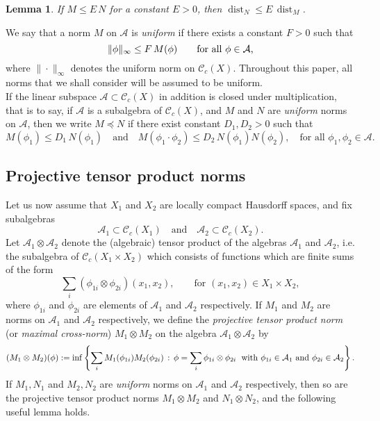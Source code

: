 \documentclass[11pt,reqno,a4paper]{amsart}
\numberwithin{equation}{section}
\newcommand{\cA}{\mathcal{A}}
\newcommand{\cC}{\mathcal{C}}
\newcommand{\qand}{\quad \textrm{and} \quad}
\DeclareMathOperator{\dist}{dist}
\theoremstyle{theorem}
\newtheorem{lemma}[theorem]{Lemma}
\theoremstyle{definition}
\begin{document}
\begin{lemma}
\label{lemma:normbnds}
If $M \leq E \, N$ for a constant $E > 0$, then $\dist_{N} \leq E \, \dist_M$.  
\end{lemma}

We say that a norm $M$ on $\cA$ is \emph{uniform} if there exists a constant $F>0$ such that 
$$
\|\phi \|_\infty \leq F\, M(\phi)\quad\quad \hbox{for all $\phi \in \cA$,}
$$  where $\| \cdot \|_\infty$ denotes the uniform norm on 
$\cC_c(X)$. Throughout this paper, all norms that we shall consider will be assumed to be uniform. \\

If the linear subspace $\cA \subset\cC_c(X)$ in addition is closed under multiplication, that is to say, if 
$\cA$ is a subalgebra of $\cC_c(X)$, and $M$ and $N$ are \emph{uniform} norms on $\cA$, then we 
write $M \preceq N$ if there exist constant $D_1, D_2>0$ such that
\[
M(\phi_1) \leq D_1\, N(\phi_1) \qand M(\phi_1\cdot \phi_2) \leq D_2\, N(\phi_1) N(\phi_2), \quad \textrm{for all $\phi_1, \phi_2 \in \cA$}.
\]

\subsection{Projective tensor product norms}

Let us now assume that $X_1$ and $X_2$ are locally compact Hausdorff spaces, and fix subalgebras
\[
\cA_1 \subset\cC_c(X_1) \qand \cA_2 \subset\cC_c(X_2).
\]
Let $\cA_1 \otimes \cA_2$ denote the (algebraic) tensor product of the algebras $\cA_1$ and $\cA_2$, i.e. the subalgebra of $\cC_c(X_1 \times X_2)$ which consists of functions which are finite sums of the form
\[
\sum_{i} (\phi_{1i} \otimes \phi_{2i})(x_1,x_2),\quad \quad \textrm{for $(x_1,x_2) \in X_1 \times X_2$},
\]
where $\phi_{1i}$ and $\phi_{2i}$ are elements of $\cA_1$ and $\cA_2$ respectively. If $M_1$ and $M_2$ are norms on $\cA_1$ and $\cA_2$ respectively, we define the \emph{projective tensor product norm} (or \emph{maximal cross-norm}) $M_1 \otimes M_2$ on the algebra $\cA_1 \otimes \cA_2$
by 
\[
(M_1 \otimes M_2)(\phi) := \inf\left\{ \sum_i M_1(\phi_{1i}) M_2(\phi_{2i}) \, : \, \phi = \sum_i \phi_{1i} \otimes \phi_{2i}\;\hbox{ with } \phi_{1i}\in\cA_1\hbox{ and } \phi_{2i}\in\cA_2 \right\}.
\]
If $M_1, N_1$ and $M_2, N_2$ are \emph{uniform} norms on $\cA_1$ and $\cA_2$ respectively, then
so are the projective tensor product norms $M_1 \otimes M_2$ and $N_1 \otimes N_2$, and the following useful lemma holds.
\end{document}
